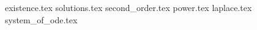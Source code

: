 \documentclass[11pt,twoside]{report}
\begin{document}
    {existence.tex}
    {solutions.tex}
    {second_order.tex}
    {power.tex}
    {laplace.tex}
    {system_of_ode.tex}
\end{document}

